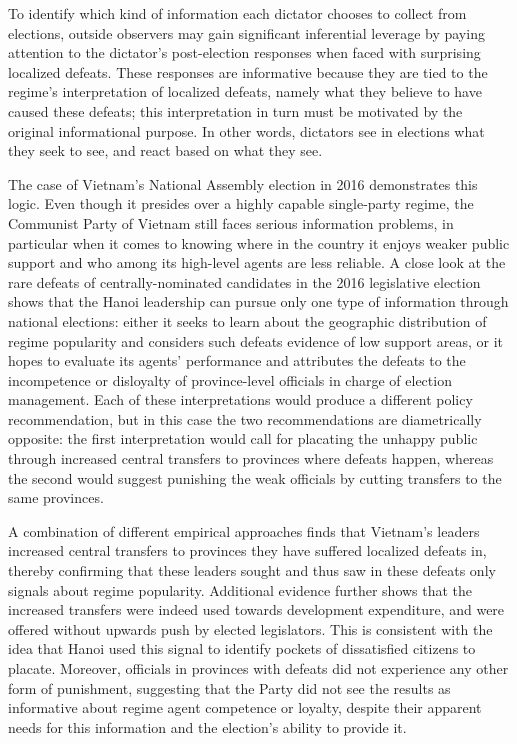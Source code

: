 \documentclass[12pt]{article}
\newcommand{\1}{\mathbbm{1}}
\begin{document}
To identify which kind of information each dictator chooses to collect from elections, outside observers may gain significant inferential leverage by paying attention to the dictator's post-election responses when faced with surprising localized defeats. These responses are informative because they are tied to the regime's interpretation of localized defeats, namely what they believe to have caused these defeats; this interpretation in turn must be motivated by the original informational purpose. In other words, dictators see in elections what they seek to see, and react based on what they see.

The case of Vietnam's National Assembly election in 2016 demonstrates this logic. Even though it presides over a highly capable single-party regime, the Communist Party of Vietnam still faces serious information problems, in particular when it comes to knowing where in the country it enjoys weaker public support and who among its high-level agents are less reliable. A close look at the rare defeats of centrally-nominated candidates in the 2016 legislative election shows that the Hanoi leadership can pursue only one type of information through national elections: either it seeks to learn about the geographic distribution of regime popularity and considers such defeats evidence of low support areas, or it hopes to evaluate its agents' performance and attributes the defeats to the incompetence or disloyalty of province-level officials in charge of election management. Each of these interpretations would produce a different policy recommendation, but in this case the two recommendations are diametrically opposite: the first interpretation would call for placating the unhappy public through increased central transfers to provinces where defeats happen, whereas the second would suggest punishing the weak officials by cutting transfers to the same provinces.

A combination of different empirical approaches finds that Vietnam's leaders increased central transfers to provinces they have suffered localized defeats in, thereby confirming that these leaders sought and thus saw in these defeats only signals about regime popularity. Additional evidence further shows that the increased transfers were indeed used towards development expenditure, and were offered without upwards push by elected legislators. This is consistent with the idea that Hanoi used this signal to identify pockets of dissatisfied citizens to placate. Moreover, officials in provinces with defeats did not experience any other form of punishment, suggesting that the Party did not see the results as informative about regime agent competence or loyalty, despite their apparent needs for this information and the election's ability to provide it. 
\end{document}
